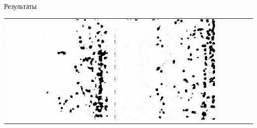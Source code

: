 \documentclass[12pt]{beamer}
\begin{document}
\begin{frame}{Результаты}
\begin{table}
\begin{center}
\begin{tabular}{p{1.2cm} p{1.2cm} p{1.2cm} p{1.2cm} p{1.2cm} p{1.2cm} p{1.2cm}}
					\includegraphics[width=1\linewidth]{8-results/sand-trend2/nf8/gen2}
					&
					\includegraphics[width=1\linewidth]{8-results/sand-trend2/nf16/gen2}
					&

\end{tabular}
\end{center}
\end{table}
\end{frame}
\end{document}
